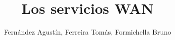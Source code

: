 \documentclass{report}
\title{Los servicios WAN}
\author{Fernández Agustín, Ferreira Tomás, Formichella Bruno}
\begin{document}
\blindtext
\end{document}
